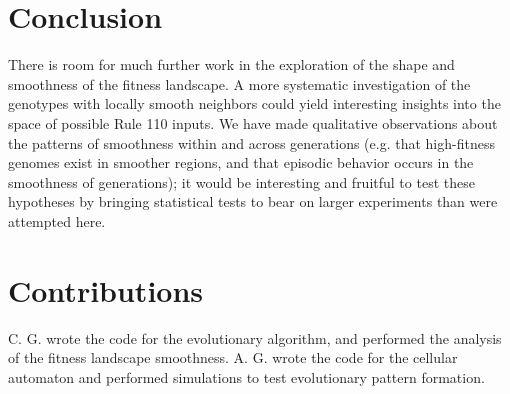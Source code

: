 \documentclass[twocolumn]{article}
\begin{document}
\section{Conclusion}

There is room for much further work in the exploration of the shape and smoothness of the fitness landscape. A more systematic investigation of the genotypes with locally smooth neighbors could yield interesting insights into the space of possible Rule 110 inputs. We have made qualitative observations about the patterns of smoothness within and across generations (e.g. that high-fitness genomes exist in smoother regions, and that episodic behavior occurs in the smoothness of generations); it would be interesting and fruitful to test these hypotheses by bringing statistical tests to bear on larger experiments than were attempted here.

\section{Contributions}

C. G. wrote the code for the evolutionary algorithm, and performed the analysis of the fitness landscape smoothness. A. G. wrote the code for the cellular automaton and performed simulations to test evolutionary pattern formation.  




\end{document}
